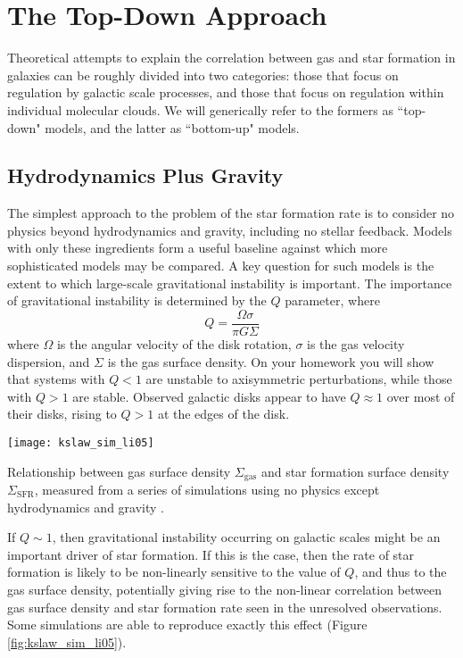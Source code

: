 \section{The Top-Down Approach}

Theoretical attempts to explain the correlation between gas and star formation in galaxies can be roughly divided into two categories: those that focus on regulation by galactic scale processes, and those that focus on regulation within individual molecular clouds. We will generically refer to the formers as ``top-down" models, and the latter as ``bottom-up" models.

\subsection{Hydrodynamics Plus Gravity}

The simplest approach to the problem of the star formation rate is to consider no physics beyond hydrodynamics and gravity, including no stellar feedback. Models with only these ingredients form a useful baseline against which more sophisticated models may be compared. A key question for such models is the extent to which large-scale gravitational instability is important. The importance of gravitational instability is determined by the \citet{toomre64a} $Q$ parameter, where
\begin{equation}
Q = \frac{\Omega \sigma}{\pi G \Sigma}
\end{equation}
where $\Omega$ is the angular velocity of the disk rotation, $\sigma$ is the gas velocity dispersion, and $\Sigma$ is the gas surface density. On your homework you will show that systems with $Q < 1$ are unstable to axisymmetric perturbations, while those with $Q>1$ are stable. Observed galactic disks appear to have $Q \approx 1$ over most of their disks, rising to $Q > 1$ at the edges of the disk.

\begin{marginfigure}
\texttt{[image: kslaw\_sim\_li05]}
\caption[Kennicutt-Schmidt relation from simulations with only gravity and hydrodynamics]{
\label{fig:kslaw_sim_li05}
Relationship between gas surface density $\Sigma_{\mathrm{gas}}$ and star formation surface density $\Sigma_{\mathrm{SFR}}$, measured from a series of simulations using no physics except hydrodynamics and gravity \citet{li05a}.
}
\end{marginfigure}
If $Q \sim 1$, then gravitational instability occurring on galactic scales might be an important driver of star formation. If this is the case, then the rate of star formation is likely to be non-linearly sensitive to the value of $Q$, and thus to the gas surface density, potentially giving rise to the non-linear correlation between gas surface density and star formation rate seen in the unresolved observations. Some simulations are able to reproduce exactly this effect (Figure \ref{fig:kslaw_sim_li05}).

